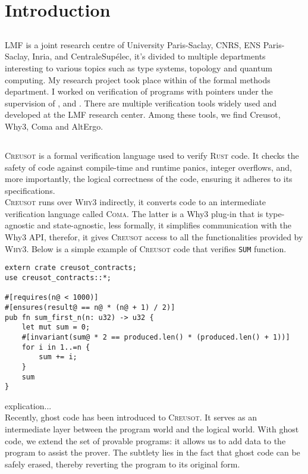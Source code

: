 \chapter{Introduction}

\section{}
LMF is a joint research centre of University Paris-Saclay, CNRS, ENS Paris-Saclay, Inria, and CentraleSupélec, it's divided to multiple departments interesting to various topics such as type systems, topology and quantum computing. My research project took place within  of the formal methods department. I worked on verification of programs with pointers under the supervision of ,  and .
There are multiple verification tools widely used and developed at the LMF research center. Among these tools, we find Creusot, Why3, Coma and AltErgo. 

\section{}
\textsc{Creusot} is a formal verification language used to verify \textsc{Rust} code. It checks the safety of code against compile-time and runtime panics, integer overflows, and, more importantly, the logical correctness of the code, ensuring it adheres to its specifications.\\
\textsc{Creusot} runs over \textsc{Why3} indirectly, it converts code to an intermediate verification language called \textsc{Coma}. The latter is a Why3 plug-in that is type-agnostic and state-agnostic, less formally, it simplifies communication with the Why3 API, therefor, it gives \textsc{Creusot} access to all the functionalities provided by \textsc{Why3}.
Below is a simple example of \textsc{Creusot} code that verifies \texttt{SUM} function. 
\newpage
\begin{verbatim}
extern crate creusot_contracts;
use creusot_contracts::*;

#[requires(n@ < 1000)]
#[ensures(result@ == n@ * (n@ + 1) / 2)]
pub fn sum_first_n(n: u32) -> u32 {
    let mut sum = 0;
    #[invariant(sum@ * 2 == produced.len() * (produced.len() + 1))]
    for i in 1..=n {
        sum += i;
    }
    sum
}
\end{verbatim}
explication...\\
Recently, ghost code has been introduced to \textsc{Creusot}. It serves as an intermediate layer between the program world and the logical world. With ghost code, we extend the set of provable programs: it allows us to add data to the program to assist the prover. The subtlety lies in the fact that ghost code can be safely erased, thereby reverting the program to its original form.

